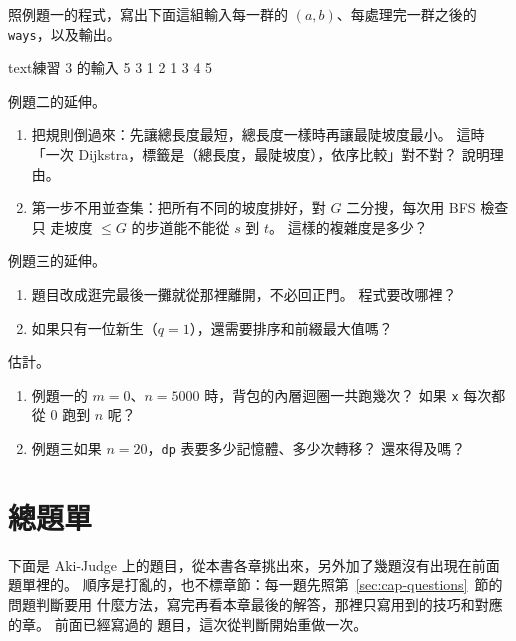 \begin{drills}[label=drills:cap]
\item 照例題一的程式，寫出下面這組輸入每一群的 $(a, b)$、每處理完一群之後的
\texttt{ways}，以及輸出。
\begin{code}{text}{練習 3 的輸入}
5 3
1 2
1 3
4 5
\end{code}

\item 例題二的延伸。
\begin{enumerate}
\item 把規則倒過來：先讓總長度最短，總長度一樣時再讓最陡坡度最小。 這時「一次
Dijkstra，標籤是（總長度，最陡坡度），依序比較」對不對？ 說明理由。
\item 第一步不用並查集：把所有不同的坡度排好，對 $G$ 二分搜，每次用 BFS 檢查只
走坡度 $\le G$ 的步道能不能從 $s$ 到 $t$。 這樣的複雜度是多少？
\end{enumerate}

\item 例題三的延伸。
\begin{enumerate}
\item 題目改成逛完最後一攤就從那裡離開，不必回正門。 程式要改哪裡？
\item 如果只有一位新生（$q = 1$），還需要排序和前綴最大值嗎？
\end{enumerate}

\item 估計。
\begin{enumerate}
\item 例題一的 $m = 0$、$n = 5000$ 時，背包的內層迴圈一共跑幾次？ 如果
\texttt{x} 每次都從 $0$ 跑到 $n$ 呢？
\item 例題三如果 $n = 20$，\texttt{dp} 表要多少記憶體、多少次轉移？ 還來得及嗎？
\end{enumerate}
\end{drills}

\section{總題單}
\label{sec:cap-practice}

下面是 Aki-Judge 上的題目，從本書各章挑出來，另外加了幾題沒有出現在前面題單裡的。
順序是打亂的，也不標章節：每一題先照第~\ref{sec:cap-questions}~節的問題判斷要用
什麼方法，寫完再看本章最後的解答，那裡只寫用到的技巧和對應的章。 前面已經寫過的
題目，這次從判斷開始重做一次。


